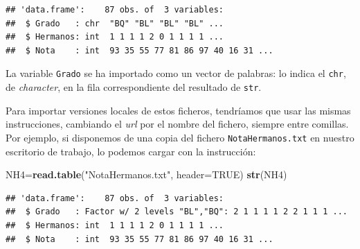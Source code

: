 \documentclass[]{book}
\newenvironment{Shaded}{\begin{snugshade}}{\end{snugshade}}
\newcommand{\DataTypeTok}[1]{\textcolor[rgb]{0.13,0.29,0.53}{#1}}
\newcommand{\KeywordTok}[1]{\textcolor[rgb]{0.13,0.29,0.53}{\textbf{#1}}}
\newcommand{\NormalTok}[1]{#1}
\newcommand{\OtherTok}[1]{\textcolor[rgb]{0.56,0.35,0.01}{#1}}
\newcommand{\StringTok}[1]{\textcolor[rgb]{0.31,0.60,0.02}{#1}}
\theoremstyle{definition}
\theoremstyle{definition}
\theoremstyle{definition}
\theoremstyle{remark}
\begin{document}
\begin{verbatim}
## 'data.frame':    87 obs. of  3 variables:
##  $ Grado   : chr  "BQ" "BL" "BL" "BL" ...
##  $ Hermanos: int  1 1 1 1 2 0 1 1 1 1 ...
##  $ Nota    : int  93 35 55 77 81 86 97 40 16 31 ...
\end{verbatim}

La variable \texttt{Grado} se ha importado como un vector de palabras: lo indica el \texttt{chr}, de \emph{character}, en la fila correspondiente del resultado de \texttt{str}.

Para importar versiones locales de estos ficheros, tendríamos que usar las mismas instrucciones, cambiando el \emph{url} por el nombre del fichero, siempre entre comillas. Por ejemplo, si disponemos de una copia del fichero \texttt{NotaHermanos.txt} en nuestro escritorio de trabajo, lo podemos cargar con la instrucción:

\begin{Shaded}
\begin{Highlighting}[]
\NormalTok{NH4=}\KeywordTok{read.table}\NormalTok{(}\StringTok{"NotaHermanos.txt"}\NormalTok{, }\DataTypeTok{header=}\OtherTok{TRUE}\NormalTok{)}
\KeywordTok{str}\NormalTok{(NH4)}
\end{Highlighting}
\end{Shaded}

\begin{verbatim}
## 'data.frame':    87 obs. of  3 variables:
##  $ Grado   : Factor w/ 2 levels "BL","BQ": 2 1 1 1 1 2 2 1 1 1 ...
##  $ Hermanos: int  1 1 1 1 2 0 1 1 1 1 ...
##  $ Nota    : int  93 35 55 77 81 86 97 40 16 31 ...
\end{verbatim}
\end{document}
